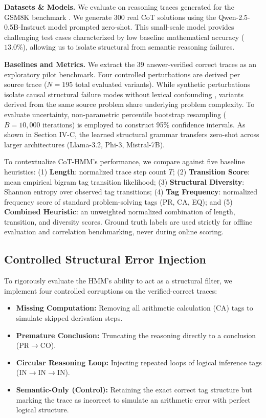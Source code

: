 \documentclass[conference]{IEEEtran}
\begin{document}
\textbf{Datasets \& Models.} We evaluate on reasoning traces generated for the GSM8K benchmark \cite{cobbe2021training}. We generate 300 real CoT solutions using the Qwen-2.5-0.5B-Instruct model prompted zero-shot. This small-scale model provides challenging test cases characterized by low baseline mathematical accuracy ($13.0\%$), allowing us to isolate structural from semantic reasoning failures.

\textbf{Baselines and Metrics.} We extract the 39 answer-verified correct traces as an exploratory pilot benchmark. Four controlled perturbations are derived per source trace ($N=195$ total evaluated variants). While synthetic perturbations isolate causal structural failure modes without lexical confounding \cite{golovneva2023roscoe}, variants derived from the same source problem share underlying problem complexity. To evaluate uncertainty, non-parametric percentile bootstrap resampling ($B=10{,}000$ iterations) is employed to construct 95\% confidence intervals. As shown in Section IV-C, the learned structural grammar transfers zero-shot across larger architectures (Llama-3.2, Phi-3, Mistral-7B).

To contextualize CoT-HMM's performance, we compare against five baseline heuristics: (1) \textbf{Length}: normalized trace step count $T$; (2) \textbf{Transition Score}: mean empirical bigram tag transition likelihood; (3) \textbf{Structural Diversity}: Shannon entropy over observed tag transitions; (4) \textbf{Tag Frequency}: normalized frequency score of standard problem-solving tags (PR, CA, EQ); and (5) \textbf{Combined Heuristic}: an unweighted normalized combination of length, transition, and diversity scores. Ground truth labels are used strictly for offline evaluation and correlation benchmarking, never during online scoring.

\subsection{Controlled Structural Error Injection}

To rigorously evaluate the HMM's ability to act as a structural filter, we implement four controlled corruptions on the verified-correct traces:
\begin{itemize}
    \item \textbf{Missing Computation:} Removing all arithmetic calculation (CA) tags to simulate skipped derivation steps.
    \item \textbf{Premature Conclusion:} Truncating the reasoning directly to a conclusion (PR$\rightarrow$CO).
    \item \textbf{Circular Reasoning Loop:} Injecting repeated loops of logical inference tags (IN$\rightarrow$IN$\rightarrow$IN).
    \item \textbf{Semantic-Only (Control):} Retaining the exact correct tag structure but marking the trace as incorrect to simulate an arithmetic error with perfect logical structure.
\end{itemize}
\end{document}

